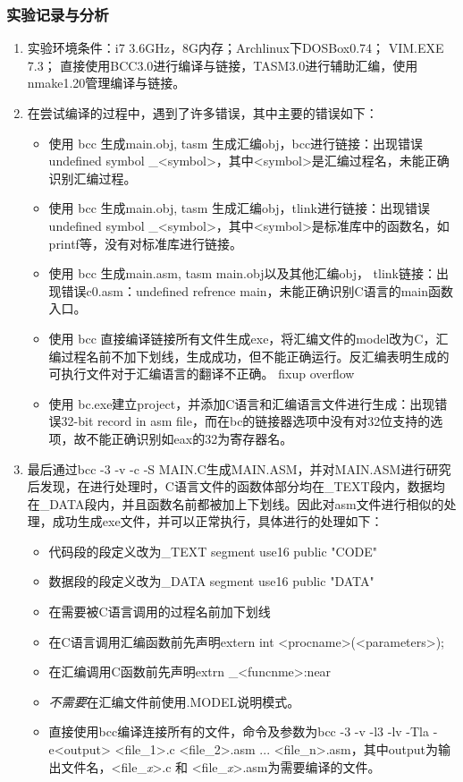 \documentclass{article}
\begin{document}
	\subsubsection{实验记录与分析}
	\begin{enumerate}
		\item 实验环境条件：i7 3.6GHz，8G内存；Archlinux下DOSBox0.74； VIM.EXE 7.3； 直接使用BCC3.0进行编译与链接，TASM3.0进行辅助汇编，使用nmake1.20管理编译与链接。

		\item 在尝试编译的过程中，遇到了许多错误，其中主要的错误如下：
			\begin{itemize}
				\item 使用 bcc 生成main.obj, tasm 生成汇编obj，bcc进行链接：出现错误undefined symbol \_<symbol>，其中<symbol>是汇编过程名，未能正确识别汇编过程。
				\item 使用 bcc 生成main.obj, tasm 生成汇编obj，tlink进行链接：出现错误undefined symbol \_<symbol>，其中<symbol>是标准库中的函数名，如printf等，没有对标准库进行链接。
				\item 使用 bcc 生成main.asm, tasm main.obj以及其他汇编obj， tlink链接：出现错误c0.asm：undefined refrence main，未能正确识别C语言的main函数入口。
				\item 使用 bcc 直接编译链接所有文件生成exe，将汇编文件的model改为C，汇编过程名前不加下划线，生成成功，但不能正确运行。反汇编表明生成的可执行文件对于汇编语言的翻译不正确。 fixup overflow
				\item 使用 bc.exe建立project，并添加C语言和汇编语言文件进行生成：出现错误32-bit record in asm file，而在bc的链接器选项中没有对32位支持的选项，故不能正确识别如eax的32为寄存器名。
			\end{itemize}

		\item 最后通过bcc -3 -v -c -S MAIN.C生成MAIN.ASM，并对MAIN.ASM进行研究后发现，在进行处理时，C语言文件的函数体部分均在\_TEXT段内，数据均在\_DATA段内，并且函数名前都被加上下划线。因此对asm文件进行相似的处理，成功生成exe文件，并可以正常执行，具体进行的处理如下：
			\begin{itemize}
				\item 代码段的段定义改为\_TEXT segment use16 public "CODE"
				\item 数据段的段定义改为\_DATA segment use16 public "DATA"
				\item 在需要被C语言调用的过程名前加下划线
				\item 在C语言调用汇编函数前先声明extern int <procname>(<parameters>);
				\item 在汇编调用C函数前先声明extrn \_<funcnme>:near
				\item \textit{不需要}在汇编文件前使用.MODEL说明模式。
				\item 直接使用bcc编译连接所有的文件，命令及参数为bcc -3 -v -l3 -lv -Tla -e<output> <file\_1>.c <file\_2>.asm ... <file\_n>.asm，其中output为输出文件名，<file\_\textit{x}>.c 和 <file\_\textit{x}>.asm为需要编译的文件。
			\end{itemize}


\end{enumerate}
\end{document}
